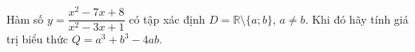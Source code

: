 \begin{ex}
Hàm số $y=\dfrac{x^2-7x+8}{x^2-3x+1}$ có tập xác định $D=\mathbb R\setminus\{a;b\}$, $a\ne b$. Khi đó hãy tính giá trị biểu thức $Q=a^3+b^3-4ab$.
\end{ex}
